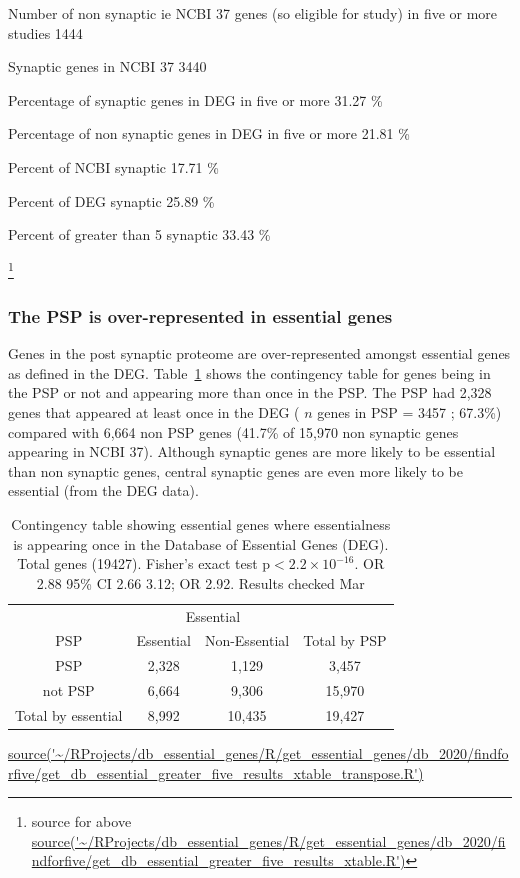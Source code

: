      Number of non synaptic ie NCBI 37 genes (so eligible for study)             in five or more studies 1444  
     
     Synaptic genes in NCBI 37 3440  
     
     Percentage of synaptic genes in DEG in five or more 31.27 \%  
     
     Percentage of non synaptic genes in DEG in five or more 21.81 \% 
     
     Percent of NCBI synaptic 17.71 \%  
     
     Percent of DEG synaptic 25.89 \%  
     
     Percent of greater than 5 synaptic 33.43 \% 
     
     \footnote{source for above \url{source('~/RProjects/db_essential_genes/R/get_essential_genes/db_2020/findforfive/get_db_essential_greater_five_results_xtable.R')}}
     
 
\subsubsection{The PSP is over-represented in essential genes}
\label{sec:results over representation PSP in DEG genes}
Genes in the post synaptic proteome are over-represented amongst essential genes as defined in the DEG. Table~\ref{tab:DEG any appearance contingency table PSP vs not PSP} shows the contingency table for genes being in the PSP or not and appearing more than once in the PSP. The PSP had 2,328 genes that appeared at least once in the DEG (    $n$ genes in PSP = 3457 ; 67.3\%) compared with 6,664 non PSP genes (41.7\% of 15,970 non synaptic genes appearing in NCBI 37). Although synaptic genes are more likely to be essential than non synaptic genes, central synaptic genes are even more likely to be essential (from the DEG data). 


\begin{table}
\centering
\begin{tabular}{cccc}
\toprule
& \multicolumn{2}{c}{Essential} & \\
\cmidrule{2-3}
    PSP & Essential &  Non-Essential & Total by PSP\vspace{1mm} \\
\midrule 
PSP      &   2,328     &     1,129 & 3,457\vspace{1mm}\\
not PSP    &  6,664      &    9,306  & 15,970\vspace{1mm}\\
\midrule
 Total by essential & 8,992 & 10,435 &  19,427\\ 

 
\bottomrule
\end{tabular}
\caption{Contingency table showing essential genes where essentialness is appearing once in the Database of Essential Genes (DEG). Total genes (19427).  Fisher's exact test p$<2.2\times10^{-16}$. OR 2.88 95\% CI 2.66 3.12; OR 2.92. Results checked Mar}
\tiny\url{source('~/RProjects/db_essential_genes/R/get_essential_genes/db_2020/findforfive/get_db_essential_greater_five_results_xtable_transpose.R')}  
\label{tab:DEG any appearance contingency table PSP vs not PSP}
\end{table}




